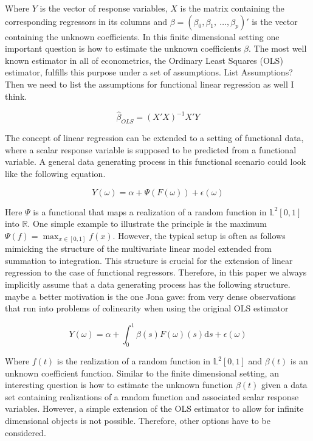 \documentclass[11pt,twoside,a4paper]{article}
\begin{document}
	Where $Y$ is the vector of response variables, $X$ is the matrix containing the corresponding regressors in its columns and $\beta = (\beta_0, \beta_1, \: \dots, \beta_p)'$ is the vector containing the unknown coefficients.
	In this finite dimensional setting one important question is how to estimate the unknown coefficients $\beta$. The most well known estimator in all of econometrics, the Ordinary Least Squares (OLS) estimator, fulfills this purpose under a set of assumptions. {\color{red}List Assumptions? Then we need to list the assumptions for functional linear regression as well I think.}
	
	\begin{equation}
		\hat{\beta}_{OLS} = (X'X)^{-1}X'Y
	\end{equation}
	
	The concept of linear regression can be extended to a setting of functional data, where a scalar response variable is supposed to be predicted from a functional variable. 
	A general data generating process in this functional scenario could look like the following equation.
	
	\begin{equation}
		Y(\omega) = \alpha + \Psi\left(F(\omega)\right) + \epsilon(\omega)
	\end{equation}
	
	Here $\Psi$ is a functional that maps a realization of a random function in $\mathbb{L}^2[0,1]$ into $\mathbb{R}$. One simple example to illustrate the principle is the maximum $\Psi(f) = \max_{x \in [0,1]}f(x)$.
	However, the typical setup is often as follows mimicking the structure of the multivariate linear model extended from summation to integration. This structure is crucial for the extension of linear regression to the case of functional regressors. Therefore, in this paper we always implicitly assume that a data generating process has the following structure. {\color{red} maybe a better motivation is the one Jona gave: from very dense observations that run into problems of colinearity when using the original OLS estimator}
	
	\begin{equation}\label{DGP}
		Y(\omega) = \alpha + \int_{0}^{1} \beta(s)F(\omega)(s) \mathrm{d}s + \epsilon(\omega)
	\end{equation}
	
	Where $f(t)$ is the realization of a random function in $\mathbb{L}^2[0,1]$ and $\beta(t)$ is an unknown coefficient function. 
	Similar to the finite dimensional setting, an interesting question is how to estimate the unknown function $\beta(t)$ given a data set containing realizations of a random function and associated scalar response variables. However, a simple extension of the OLS estimator to allow for infinite dimensional objects is not possible. Therefore, other options have to be considered.
	
\end{document}
